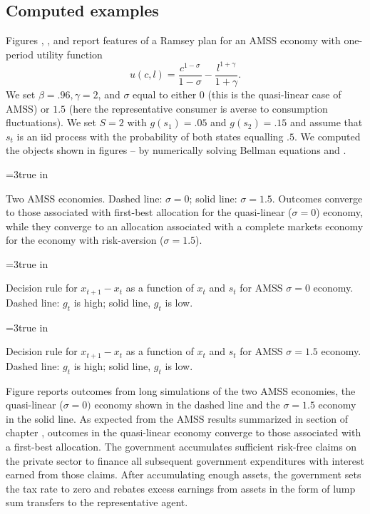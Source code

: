\subsection{Computed examples}%

Figures , , and  report features of a Ramsey plan for an AMSS economy with
one-period utility function
$$ u(c,l) = {\frac{c^{1-\sigma}}{1-\sigma}} - {\frac{l^{1+\gamma}}{1+\gamma}} . $$
We set $\beta = .96, \gamma = 2$, and $\sigma$ equal to either $0$ (this is the
quasi-linear case of AMSS) or $1.5$ (here the representative consumer is averse to
consumption fluctuations).  We set
$S=2$ with $g(s_1) = .05$ and $g(s_2) = .15$ and assume that $s_t$ is an iid process with
the probability of both states equalling $.5$.  We computed the objects shown in figures --
by numerically solving  Bellman equations  and .


\centerline{\epsfxsize=3true in}
\caption{Two AMSS economies. Dashed line: $\sigma=0$; solid line: $\sigma = 1.5$. Outcomes converge to those associated with  first-best allocation for the
quasi-linear ($\sigma =0$) economy, while they converge to an allocation associated with a complete markets economy for the economy with risk-aversion ($\sigma=1.5$).}
\endfigure


\centerline{\epsfxsize=3true in}
\caption{Decision rule for $x_{t+1}- x_t$ as a function of $x_t$ and $s_t$ for AMSS $\sigma=0$ economy.
Dashed line: $g_t$ is high; solid line, $g_t$  is low.}
\endfigure



\centerline{\epsfxsize=3true in}
\caption{Decision rule for $x_{t+1}- x_t$ as a function of $x_t$ and $s_t$ for AMSS $\sigma=1.5$ economy.
Dashed line: $g_t$  is high; solid line, $g_t$  is low. }
\endfigure

%
%
Figure  reports outcomes from
long simulations of the two AMSS economies, the quasi-linear ($\sigma=0)$ economy shown in the dashed line and the
 $\sigma=1.5$ economy in the solid line.  As expected from the AMSS results summarized in section  of chapter , outcomes in the  quasi-linear economy
converge to those
associated with a first-best allocation. The government accumulates sufficient risk-free claims on the private sector  to finance all subsequent government expenditures
with interest earned from those claims. After accumulating enough assets,
the government sets the tax rate to zero and rebates excess earnings
from assets in the form of  lump sum transfers to the representative agent.

